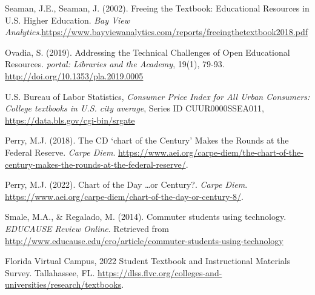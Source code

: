 \documentclass[11pt]{article}
\begin{document}
\begin{thebibliography}{99}
   Seaman, J.E., Seaman, J. (2002). Freeing the Textbook: Educational Resources in U.S. Higher Education. {\em Bay View Analytics}.\newline \href{https://www.bayviewanalytics.com/reports/freeingthetextbook2018.pdf}{https://www.bayviewanalytics.com/reports/freeingthetextbook2018.pdf}

   Ovadia, S. (2019). Addressing the Technical Challenges of Open Educational Resources.  {\em portal: Libraries and the Academy}, 19(1), 79-93. \href{http://doi.org/10.1353/pla.2019.0005}{http://doi.org/10.1353/pla.2019.0005}

   U.S. Bureau of Labor Statistics, {\em Consumer Price Index for All Urban Consumers: College textbooks in U.S. city average}, Series ID CUUR0000SSEA011, \href{https://data.bls.gov/cgi-bin/srgate}{https://data.bls.gov/cgi-bin/srgate}

   Perry, M.J. (2018). The CD `chart of the Century' Makes the Rounds at the Federal Reserve. {\em Carpe Diem}. \href{https://www.aei.org/carpe-diem/the-chart-of-the-century-makes-the-rounds-at-the-federal-reserve/}{https://www.aei.org/carpe-diem/the-chart-of-the-century-makes-the-rounds-at-the-federal-reserve/}.

   Perry, M.J. (2022). Chart of the Day \ldots or Century?. {\em Carpe Diem}. \href{https://www.aei.org/carpe-diem/chart-of-the-day-or-century-8/}{https://www.aei.org/carpe-diem/chart-of-the-day-or-century-8/}.

   Smale, M.A., \& Regalado, M. (2014). Commuter students using technology. {\em EDUCAUSE Review Online}. Retrieved from \href{http://www.educause.edu/ero/article/commuter-students-using-technology}{http://www.educause.edu/ero/article/commuter-students-using-technology}

   Florida Virtual Campus, 2022 Student Textbook and Instructional Materials Survey. Tallahassee, FL. \href{https://dlss.flvc.org/colleges-and-universities/research/textbooks}{https://dlss.flvc.org/colleges-and-universities/research/textbooks}.

\end{thebibliography}
\end{document}
